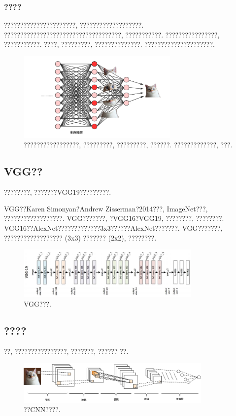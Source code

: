 \documentclass[lang=cn,11pt]{elegantpaper}
\begin{document}
\subsubsection*{????}
??????????????????????, ???????????????????. ????????????????????????????????????, ???????????. ????????????????, ???????????. ????, ?????????, ??????????????. ?????????????????????. 
\begin{figure}[htbp]
\centering
  \includegraphics[width=0.7\textwidth]{densecat.png}
  \tiny
  \caption{?????????????????, ?????????, ?????????, ??????. ?????????????, ???. \label{fig:densecat1}}
\end{figure}
\normalsize
\subsection{VGG??}
????????, ???????VGG19?????????. 

VGG??Karen Simonyan?Andrew Zisserman?2014???, ImageNet???, ??????????????????. VGG???????, ?VGG16?VGG19, ????????, ????????. VGG16??AlexNet?????????????3x3??????AlexNet???????. VGG???????, ?????????????????? (3x3) ??????? (2x2),  ????????. 
\begin{figure}[htbp]
	\centering
	  \includegraphics[width=0.80\textwidth]{VGG}
	  \tiny
	  \caption{VGG???.\label{fig:vgg}}
\end{figure}
\subsection{????}

??, ????????????????, ???????, ??????  ??. 
\begin{figure}[htbp]
	\centering
	  \includegraphics[width=0.85\textwidth]{cnn1.png}
	  \tiny
	  \caption{??CNN????.\label{fig:cnn1}}
\end{figure}
\end{document}
